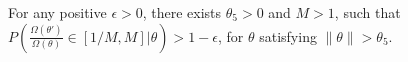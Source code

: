 \begin{assumption}
For any positive $\epsilon > 0$, there exists $\theta_5 > 0$ and $M > 1$, such that $P(\frac{\Omega(\theta')}{\Omega(\theta)} \in [1/M, M] | \theta) > 1 - \epsilon$, for $\theta$ satisfying $\parallel \theta \parallel  > \theta_5$.
  \label{asmp:omega}
\end{assumption}



